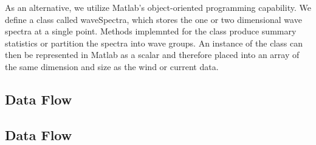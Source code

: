 \documentclass[11pt,letterpaper,oneside,reqno]{article}
\begin{document}
As an alternative, we utilize Matlab's object-oriented programming
capability. We define a class called waveSpectra, which stores the
one or two dimensional wave spectra at a single point. Methods
implemnted for the class produce summary statistics or partition
the spectra into wave groups. An instance of the class can then be
represented in Matlab as a scalar and therefore placed into an
array of the same dimension and size as the wind or current data.

\subsection{Data Flow}


\subsection{Data Flow}






\end{document}
